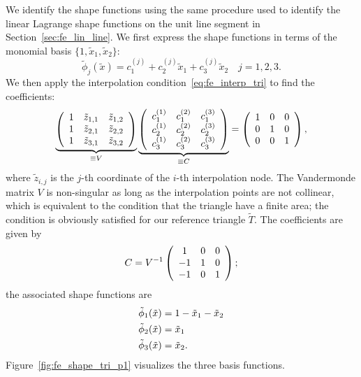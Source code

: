 We identify the shape functions using the same procedure used to identify the linear Lagrange shape functions on the unit line segment in Section~\ref{sec:fe_lin_line}. We first express the shape functions in terms of the monomial basis $\{ 1, \tilde x_1, \tilde x_2 \}$:
\begin{equation}
  \tilde \phi_j(\tilde x) = c^{(j)}_1 + c^{(j)}_2 \tilde x_1 + c_3^{(j)} \tilde x_2 \quad j = 1, 2, 3.
  \label{eq:fe_lin_tri_rep}
\end{equation}
We then apply the interpolation condition~\eqref{eq:fe_interp_tri} to find the coefficients: 
\begin{equation*}
  \underbrace{
   \bmat{ccc}
  1 & \tilde z_{1,1} & \tilde z_{1,2} \\
  1 & \tilde z_{2,1} & \tilde z_{2,2} \\
  1 & \tilde z_{3,1} & \tilde z_{3,2} \\
  \emat }_{\equiv V}
  \underbrace{ 
  \bmat{ccc}
  c_1^{(1)} & c_1^{(2)} & c_1^{(3)} \\
  c_2^{(1)} & c_2^{(2)} & c_2^{(3)} \\
  c_3^{(1)} & c_3^{(2)} & c_3^{(3)} \\
  \emat
  }_{\equiv C}
  =
  \bmat{ccc}
  1 & 0 & 0 \\
  0 & 1 & 0 \\
  0 & 0 & 1
  \emat,
\end{equation*}
where $\tilde z_{i,j}$ is the $j$-th coordinate of the $i$-th interpolation node. The Vandermonde matrix $V$ is non-singular as long as the interpolation points are not collinear, which is equivalent to the condition that the triangle have a finite area; the condition is obviously satisfied for our reference triangle $\tilde T$. The coefficients are given by 
\begin{equation*}
  C = V^{-1} \bmat{ccc}
  1 & 0 & 0\\
  -1 & 1 & 0 \\
  -1 & 0 & 1
  \emat;
\end{equation*}
the associated shape functions are
\begin{align}
  \tilde \phi_1(\tilde x) &= 1 - \tilde x_1 - \tilde x_2 \notag \\
  \tilde \phi_2(\tilde x) &= \tilde x_1 \label{eq:fe_lin_tri_expl} \\
  \tilde \phi_3(\tilde x) &= \tilde x_2. \notag
\end{align}
Figure~\ref{fig:fe_shape_tri_p1} visualizes the three basis functions.

